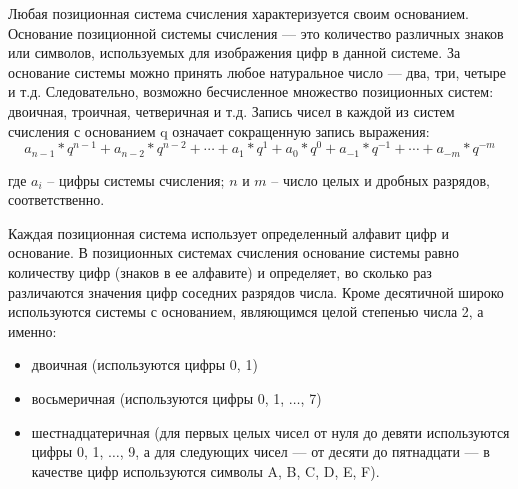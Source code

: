 \documentclass[a4paper]{article}
\begin{document}
Любая позиционная система счисления характеризуется своим основанием. Основание позиционной системы счисления — это количество различных знаков или символов, используемых для изображения цифр в данной системе. За основание системы можно принять любое натуральное число — два, три, четыре и т.д. Следовательно, возможно бесчисленное множество позиционных систем: двоичная, троичная, четверичная и т.д. Запись чисел в каждой из систем счисления с основанием q означает сокращенную запись выражения:
\begin{equation}
   a_{n-1} * q^{n-1} + a_{n-2}* q^{n-2} + \cdots + a_{1}* q^{1} + a_{0}*q^{0} + a_{-1}*q^{-1} + \cdots + a_{-m} * q^{-m}
\end{equation}
\begin{center}
  где $a_{i}$ – цифры системы счисления; $n$ и $m$ – число целых и дробных разрядов, соответственно.
\end{center}
Каждая позиционная система использует определенный алфавит цифр и основание. В позиционных системах счисления основание системы равно количеству цифр (знаков в ее алфавите) и определяет, во сколько раз различаются значения цифр соседних разрядов числа.
Кроме десятичной широко используются системы с основанием, являющимся целой степенью числа 2, а именно:
\begin{itemize}
  \item двоичная (используются цифры 0, 1)
  \item восьмеричная (используются цифры 0, 1, $\ldots$, 7)
  \item шестнадцатеричная (для первых целых чисел от нуля до девяти используются цифры 0, 1, $\ldots$, 9, а для следующих чисел --- от десяти до пятнадцати --- в качестве цифр используются символы A, B, C, D, E, F).
\end{itemize}
\end{document}
